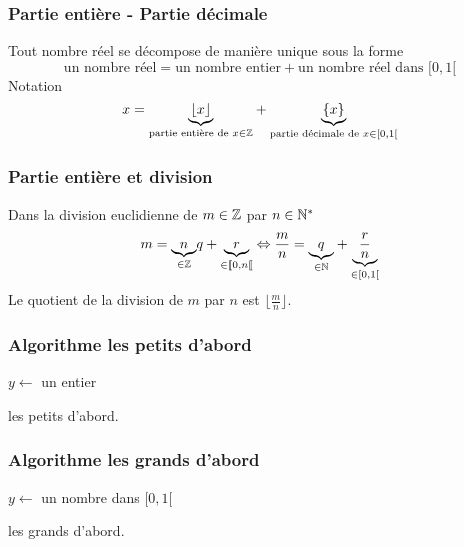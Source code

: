 



\begin{frame}
  \frametitle{Partie entière - Partie décimale}
Tout nombre réel se décompose de manière unique sous la forme
\begin{displaymath}
  \text{un nombre réel} = \text{un nombre entier} + \text{un nombre réel dans $[0,1[$}
\end{displaymath}
Notation
\begin{displaymath}
  x = \underset{\text{partie entière de } x\in \mathbb{Z} }{\underbrace{\lfloor x \rfloor}} + \underset{\text{partie décimale de } x\in [0,1[ }{\underbrace{\{ x \}}}
\end{displaymath}
\end{frame}

\begin{frame}
  \frametitle{Partie entière et division}
Dans la division euclidienne de $m\in \mathbb{Z}$ par $n\in \mathbb{N}^*$ 
\begin{displaymath}
  m = \underset{\in \mathbb{Z}}{\underbrace{n}}q + \underset{\in \llbracket 0, n\llbracket}{\underbrace{r}}
  \Leftrightarrow \frac{m}{n} = \underset{\in \mathbb{N}}{\underbrace{q}} + \underset{\in [0,1[}{\underbrace{\frac{r}{n}}} 
\end{displaymath}
Le quotient de la division de $m$ par $n$ est $\lfloor \frac{m}{n} \rfloor$.
\end{frame}

\begin{frame}
  \frametitle{Algorithme \og les petits d'abord\fg}
\begin{algorithm}[H]
  $y\longleftarrow $ un entier \;
  \caption{les petits d'abord.}
  \label{nbbin_1}
\end{algorithm}
\end{frame}

\begin{frame}
  \frametitle{Algorithme \og les grands d'abord\fg}
\begin{algorithm}[H]
  $y\longleftarrow $ un nombre dans $[0,1[$\;
  \caption{ les grands d'abord.}
  \label{nbbin_2}
\end{algorithm}
\end{frame}


